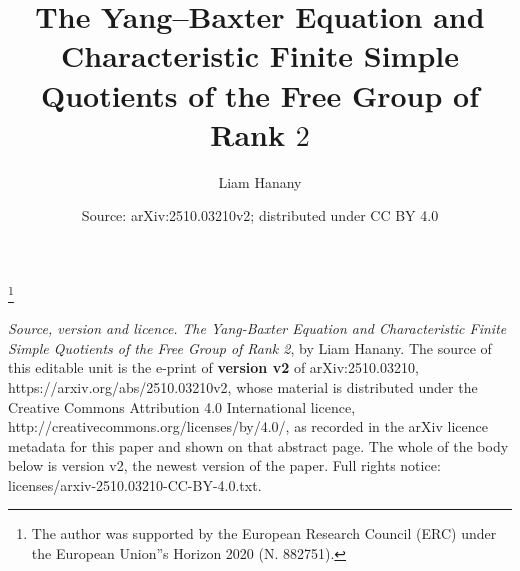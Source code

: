 \documentclass[10pt,a4paper]{amsart}
\begin{document}
\title[The Yang--Baxter Equation and Characteristic Finite Simple Quotients of $F_2$]{The Yang--Baxter Equation and Characteristic Finite Simple Quotients of the Free Group of Rank $2$}
\author{Liam Hanany}
\thanks{The author was supported by the European Research Council (ERC) under the European Union''s Horizon 2020 (N. 882751).}
\date{Source: arXiv:2510.03210v2; distributed under CC BY 4.0}
\maketitle
\noindent\emph{Source, version and licence.} \emph{The Yang-Baxter Equation and Characteristic Finite Simple Quotients of the Free Group of Rank 2}, by Liam Hanany. The source of this editable unit is the e-print of \textbf{version v2} of arXiv:2510.03210, https://arxiv.org/abs/2510.03210v2, whose material is distributed under the Creative Commons Attribution 4.0 International licence, http://creativecommons.org/licenses/by/4.0/, as recorded in the arXiv licence metadata for this paper and shown on that abstract page. The whole of the body below is version v2, the newest version of the paper. Full rights notice: licenses/arxiv-2510.03210-CC-BY-4.0.txt.\par\smallskip
\end{document}
